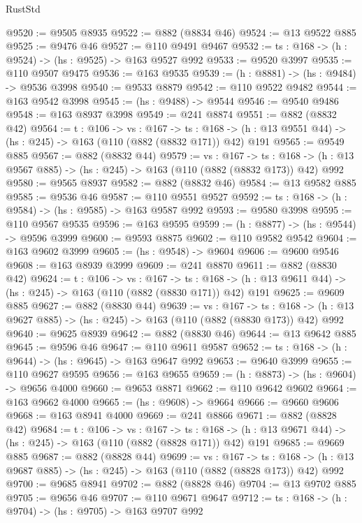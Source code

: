 \begin{lexlean}{RustStd}
\begin{coremodule}
@9520 := @9505 @8935
@9522 := @882 (@8834 @46)
@9524 := @13 @9522 @885
@9525 := @9476 @46
@9527 := @110 @9491 @9467
@9532 := {ts : @168} -> (h : @9524) -> (hs : @9525) -> @163 @9527 @992
@9533 := @9520 @3997
@9535 := @110 @9507 @9475
@9536 := @163 @9535
@9539 := (h : @8881) -> (hs : @9484) -> @9536 @3998
@9540 := @9533 @8879
@9542 := @110 @9522 @9482
@9544 := @163 @9542 @3998
@9545 := (hs : @9488) -> @9544
@9546 := @9540 @9486
@9548 := @163 @8937 @3998
@9549 := @241 @8874
@9551 := @882 (@8832 @42)
@9564 := {t : @106} ->
  {vs : @167} ->
  {ts : @168} -> (h : @13 @9551 @44) -> (hs : @245) -> @163 (@110 (@882 (@8832 @171)) @42) @191
@9565 := @9549 @885
@9567 := @882 (@8832 @44)
@9579 := {vs : @167} ->
  {ts : @168} -> (h : @13 @9567 @885) -> (hs : @245) -> @163 (@110 (@882 (@8832 @173)) @42) @992
@9580 := @9565 @8937
@9582 := @882 (@8832 @46)
@9584 := @13 @9582 @885
@9585 := @9536 @46
@9587 := @110 @9551 @9527
@9592 := {ts : @168} -> (h : @9584) -> (hs : @9585) -> @163 @9587 @992
@9593 := @9580 @3998
@9595 := @110 @9567 @9535
@9596 := @163 @9595
@9599 := (h : @8877) -> (hs : @9544) -> @9596 @3999
@9600 := @9593 @8875
@9602 := @110 @9582 @9542
@9604 := @163 @9602 @3999
@9605 := (hs : @9548) -> @9604
@9606 := @9600 @9546
@9608 := @163 @8939 @3999
@9609 := @241 @8870
@9611 := @882 (@8830 @42)
@9624 := {t : @106} ->
  {vs : @167} ->
  {ts : @168} -> (h : @13 @9611 @44) -> (hs : @245) -> @163 (@110 (@882 (@8830 @171)) @42) @191
@9625 := @9609 @885
@9627 := @882 (@8830 @44)
@9639 := {vs : @167} ->
  {ts : @168} -> (h : @13 @9627 @885) -> (hs : @245) -> @163 (@110 (@882 (@8830 @173)) @42) @992
@9640 := @9625 @8939
@9642 := @882 (@8830 @46)
@9644 := @13 @9642 @885
@9645 := @9596 @46
@9647 := @110 @9611 @9587
@9652 := {ts : @168} -> (h : @9644) -> (hs : @9645) -> @163 @9647 @992
@9653 := @9640 @3999
@9655 := @110 @9627 @9595
@9656 := @163 @9655
@9659 := (h : @8873) -> (hs : @9604) -> @9656 @4000
@9660 := @9653 @8871
@9662 := @110 @9642 @9602
@9664 := @163 @9662 @4000
@9665 := (hs : @9608) -> @9664
@9666 := @9660 @9606
@9668 := @163 @8941 @4000
@9669 := @241 @8866
@9671 := @882 (@8828 @42)
@9684 := {t : @106} ->
  {vs : @167} ->
  {ts : @168} -> (h : @13 @9671 @44) -> (hs : @245) -> @163 (@110 (@882 (@8828 @171)) @42) @191
@9685 := @9669 @885
@9687 := @882 (@8828 @44)
@9699 := {vs : @167} ->
  {ts : @168} -> (h : @13 @9687 @885) -> (hs : @245) -> @163 (@110 (@882 (@8828 @173)) @42) @992
@9700 := @9685 @8941
@9702 := @882 (@8828 @46)
@9704 := @13 @9702 @885
@9705 := @9656 @46
@9707 := @110 @9671 @9647
@9712 := {ts : @168} -> (h : @9704) -> (hs : @9705) -> @163 @9707 @992

\end{coremodule}
\end{lexlean}

